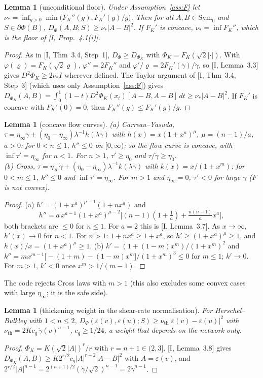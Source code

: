 \documentclass[11pt]{article}
\newtheorem{lemma}[theorem]{Lemma}
\theoremstyle{definition}
\newcommand{\eps}{\varepsilon}
\newcommand{\gd}{\dot\gamma}
\begin{document}
\begin{lemma}[unconditional floor]\label{lem:floor}
Under Assumption~\ref{ass:F} let $\nu_*=\inf_{g>0}\min\big(F_K''(g),F_K'(g)/g\big)$. Then for all $A,B\in\mathrm{Sym}_0$
and $S\in\partial\Phi(B)$, $D_\Phi(A,B;S)\ge\nu_*|A-B|^2$. If $F_K'$ is concave, $\nu_*=\inf F_K''$, which is the
floor of [I, Prop.~4.1(i)].
\end{lemma}
\begin{proof}
As in [I, Thm~3.4, Step~1], $D_\Phi\ge D_{\Phi_K}$ with $\Phi_K=F_K(\sqrt2|\cdot|)$. With $\varphi(\varrho)=F_K(\sqrt2\varrho)$,
$\varphi''=2F_K''$ and $\varphi'/\varrho=2F_K'(\gd)/\gd$, so [I, Lemma~3.3] gives $D^2\Phi_K\ge2\nu_*I$ wherever
defined. The Taylor argument of [I, Thm~3.4, Step~3] (which uses only Assumption~\ref{ass:F}) gives
$D_{\Phi_K}(A,B)=\int_0^1(1-t)D^2\Phi_K(x_t)[A-B,A-B]\,dt\ge\nu_*|A-B|^2$. If $F_K'$ is concave with $F_K'(0)=0$, then
$F_K''(g)\le F_K'(g)/g$.
\end{proof}

\begin{lemma}[concave flow curves]\label{lem:concave}
(a) Carreau--Yasuda, $\tau=\eta_\infty\gd+(\eta_0-\eta_\infty)\lambda^{-1}h(\lambda\gd)$ with $h(x)=x(1+x^a)^{\mu}$,
$\mu=(n-1)/a$, $a>0$: for $0<n\le1$, $h''\le0$ on $[0,\infty)$; so the flow curve is concave, with $\inf\tau'=\eta_\infty$
for $n<1$. For $n>1$, $\tau'\ge\eta_0$ and $\tau/\gd\ge\eta_0$.\\
(b) Cross, $\tau=\eta_\infty\gd+(\eta_0-\eta_\infty)\lambda^{-1}k(\lambda\gd)$ with $k(x)=x/(1+x^m)$: for $0<m\le1$,
$k''\le0$ and $\inf\tau'=\eta_\infty$. For $m>1$ and $\eta_\infty=0$, $\tau'<0$ for large $\gd$ ($F$ is not convex).
\end{lemma}
\begin{proof}
(a) $h'=(1+x^a)^{\mu-1}(1+nx^a)$ and
\[
h''=a\,x^{a-1}(1+x^a)^{\mu-2}\big[(n-1)(1+\tfrac1a)+\tfrac{n(n-1)}{a}x^a\big],
\]
both brackets are $\le0$ for $n\le1$. For $a=2$ this is [I, Lemma~3.7]. As $x\to\infty$, $h'(x)\to0$ for $n<1$.
For $n>1$: $1+nx^a\ge1+x^a$, so $h'\ge(1+x^a)^\mu\ge1$, and $h(x)/x=(1+x^a)^\mu\ge1$.
(b) $k'=(1+(1-m)x^m)/(1+x^m)^2$ and $k''=m x^{m-1}\big[-(1+m)-(1-m)x^m\big]/(1+x^m)^3\le0$ for $m\le1$; $k'\to0$.
For $m>1$, $k'<0$ once $x^m>1/(m-1)$.
\end{proof}
The code rejects Cross laws with $m>1$ (this also excludes some convex cases with large $\eta_\infty$; it is the safe side).

\begin{lemma}[thickening weight in the shear-rate normalisation]\label{lem:thick}
For Herschel--Bulkley with $1<n\le2$, $D_\Phi(\eps(v),\eps(u);S)\ge\nu_{\mathrm{th}}|\eps(v)-\eps(u)|^2$ with
$\nu_{\mathrm{th}}=2Kc_q\,\gd(v)^{n-1}$, $c_q\ge1/24$, a weight that depends on the network only.
\end{lemma}
\begin{proof}
$\Phi_K=K(\sqrt2|A|)^r/r$ with $r=n+1\in(2,3]$. [I, Lemma~3.8] gives $D_{\Phi_K}(A,B)\ge K2^{r/2}c_q|A|^{r-2}|A-B|^2$ with
$A=\eps(v)$, and $2^{r/2}|A|^{n-1}=2^{(n+1)/2}(\gd/\sqrt2)^{n-1}=2\gd^{n-1}$.
\end{proof}
\end{document}
